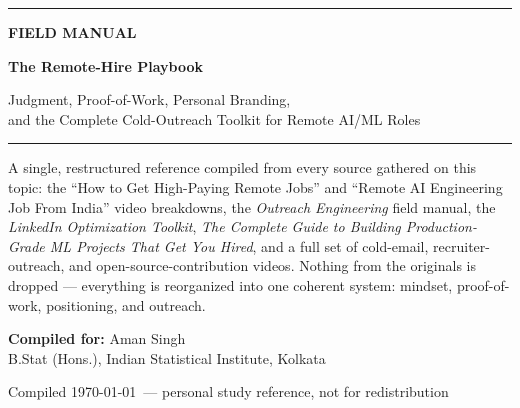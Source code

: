 \begin{titlepage}
\centering
\vspace*{1.2cm}

{\color{accent}\rule{0.4\textwidth}{1.2pt}}

\vspace{0.8cm}
{\Large\color{accent}\bfseries FIELD MANUAL}

\vspace{0.6cm}
{\fontsize{34}{40}\selectfont\bfseries\color{inkblue} The Remote-Hire Playbook}

\vspace{0.4cm}
{\Large\color{inkblue!80} Judgment, Proof-of-Work, Personal Branding, \\ and the Complete Cold-Outreach Toolkit for Remote AI/ML Roles}

\vspace{0.8cm}
{\color{accent}\rule{0.4\textwidth}{1.2pt}}

\vspace{1.6cm}

\begin{minipage}{0.82\textwidth}
\centering\small\color{greytext}
A single, restructured reference compiled from every source gathered on this topic: the ``How to Get
High-Paying Remote Jobs'' and ``Remote AI Engineering Job From India'' video breakdowns, the \emph{Outreach
Engineering} field manual, the \emph{LinkedIn Optimization Toolkit}, \emph{The Complete Guide to Building
Production-Grade ML Projects That Get You Hired}, and a full set of cold-email, recruiter-outreach, and
open-source-contribution videos. Nothing from the originals is dropped --- everything is reorganized into one
coherent system: mindset, proof-of-work, positioning, and outreach.
\end{minipage}

\vspace{2.2cm}

{\large\color{inkblue}\textbf{Compiled for:} Aman Singh}\\[2pt]
{\small\color{greytext} B.Stat (Hons.), Indian Statistical Institute, Kolkata}

\vfill

{\small\color{greytext} Compiled \today\ --- personal study reference, not for redistribution}

\end{titlepage}


